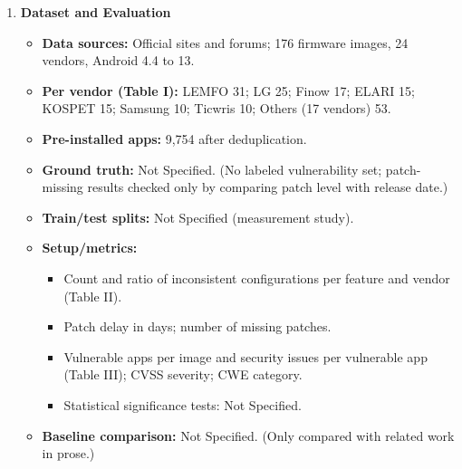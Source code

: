 \documentclass[11pt,a4paper]{article}
\newcommand{\entrypart}[1]{\textbf{\color{accent}#1}\par\vspace{2pt}}
\begin{document}
\begin{enumerate}
\begin{itemize}[leftmargin=*,itemsep=1pt,topsep=2pt]
\begin{itemize}[itemsep=0pt]
            \item \textbf{Patch missing:} AndScanner (based on SnoopSnitch); results checked by comparing patch level with patch release date.
        \end{itemize}
        \item \textbf{Stage 5: APK analysis (RQ3)}
        \begin{itemize}[itemsep=0pt]
            \item MobSF static analysis; CVSS and CWE data collected.
            \item CVE matching: CVE/CPE data from CVE and NVD sites matched to app name and version (extracted with Androguard).
        \end{itemize}
    \end{itemize}

    \item \entrypart{Dataset and Evaluation}

    \begin{itemize}[leftmargin=*,itemsep=1pt,topsep=2pt]
        \item \textbf{Data sources:} Official sites and forums; 176 firmware images, 24 vendors, Android 4.4 to 13.
        \item \textbf{Per vendor (Table I):} LEMFO 31; LG 25; Finow 17; ELARI 15; KOSPET 15; Samsung 10; Ticwris 10; Others (17 vendors) 53.
        \item \textbf{Pre-installed apps:} 9,754 after deduplication.
        \item \textbf{Ground truth:} Not Specified. (No labeled vulnerability set; patch-missing results checked only by comparing patch level with release date.)
        \item \textbf{Train/test splits:} Not Specified (measurement study).
        \item \textbf{Setup/metrics:}
        \begin{itemize}[itemsep=0pt]
            \item Count and ratio of inconsistent configurations per feature and vendor (Table II).
            \item Patch delay in days; number of missing patches.
            \item Vulnerable apps per image and security issues per vulnerable app (Table III); CVSS severity; CWE category.
            \item Statistical significance tests: Not Specified.
        \end{itemize}
        \item \textbf{Baseline comparison:} Not Specified. (Only compared with related work in prose.)
    \end{itemize}


\end{enumerate}
\end{document}
